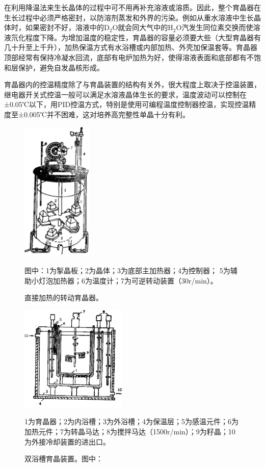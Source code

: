 在利用降温法来生长晶体的过程中可不用再补充溶液或溶质。因此，整个育晶器在生长过程中必须严格密封，以防溶剂蒸发和外界的污染。例如从重水溶液中生长晶体时，如果密封不好，溶液中的D$_2$O就会同大气中的H$_2$O汽发生同位素交换而使溶液氘化程度下降。为增加温度的稳定性，育晶器的容量必须要大些（大型育晶器有几十升至上千升），加热保温方式有水浴槽或内部加热、外壳加保温套等。育晶器顶部经常有保持冷凝水回流，底部有电炉加热为好，使得溶液表面和底部都有不饱和层保护，避免自发晶核形成。

育晶器内的控温精度除了与育晶装置的结构有关外，很大程度上取决于控温装置，继电器开关式控温一般可以满足水溶液晶体生长的要求，温度波动可以控制在±0.05℃以下，用PID控温方式，特别是使用可编程温度控制器控温，实现控温精度至±0.005℃并不困难，这对培养高完整性单晶十分有利。

\begin{figure}[htb]
 \centering
 \includegraphics[width=0.3\textwidth]{fig/cp03/img3.19.jpg}
 \caption{直接加热的转动育晶器。}
 图中：1为掣晶板；2为晶体；3为底部主加热器；4为控制器； 5为辅助小灯泡加热器；6为温度计；7为可逆转动装置（30r/min）。
\end{figure}

\begin{figure}[htb]
 \centering
 \includegraphics[width=0.45\textwidth]{fig/cp03/img3.20.jpg}
 \caption{双浴槽育晶装置。图中：}
 1为育晶器；2为内浴槽；3为外浴槽；4为保温层；5为感温元件；6为加热元件；7为转晶马达；8为搅拌马达（1500r/min）；9为籽晶；10为外接冷却装置的进出口。
\end{figure}

